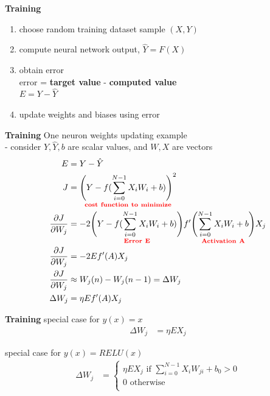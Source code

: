 \documentclass[xcolor=dvipsnames]{beamer}
\begin{document}
\begin{frame}{\bf Training}

\begin{enumerate}
  \item choose random training dataset sample $(X, Y)$
  \item compute neural network output, $\hat{Y} = F(X)$
  \item obtain error\\
    error = {\bf \color{green} target value} - {\bf \color{red} computed value} \\
    $E = Y - \hat{Y}$
  \item update weights and biases using error
\end{enumerate}

\end{frame}

\begin{frame}{\bf Training}
One neuron weights updating example \\
- consider $Y, \hat{Y}, b$ are scalar values, and $W, X$ are vectors
\begin{align*}
    E &= Y - \hat{Y} \\
    J &= \underset{\bf \color{red} cost\ function\ to\ minimize}{\left(Y - f(\sum_{i=0}^{N-1} X_iW_i + b) \right)^2} \\
    \frac{\partial J}{\partial W_j} &= -2 \underset{\bf \color{red} Error\ E}{\left(Y - f(\sum_{i=0}^{N-1} X_iW_i + b) \right)}f'\underset{\bf \color{red} Activation\ A}{\left(\sum_{i=0}^{N-1} X_iW_i + b\right)}X_j \\
    \frac{\partial J}{\partial W_j} &= -2Ef'(A)X_j \\
    \frac{\partial J}{\partial W_j} &\approx W_j(n) - W_j(n-1) = \Delta W_j \\
    \Delta W_j &=  \eta Ef'(A)X_j\
\end{align*}
\end{frame}

\begin{frame}{\bf Training}
special case for $y(x) = x$
    \begin{align*}
    \Delta W_j &=  \eta EX_j
    \end{align*}

special case for $y(x) = RELU(x)$
        \begin{align*}
        \Delta W_j &=
        \begin{cases}
            \eta EX_j \text{ if $\sum_{i=0}^{N-1} X_iW_{ji} + b_0 > 0$}\\
            0 \text{ otherwise} \\
        \end{cases}
        \end{align*}
\end{frame}
\end{document}
